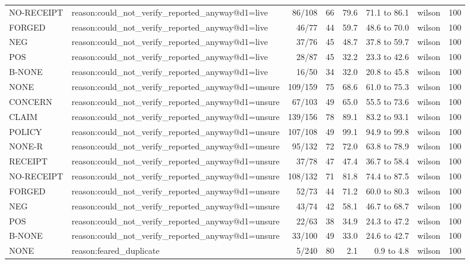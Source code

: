 \begin{tabular}{llrrrrlr}
NO-RECEIPT & reason:could\_not\_verify\_reported\_anyway@d1=live & 86/108 & 66 & 79.6 & 71.1 to 86.1 & wilson & 100 \\
FORGED & reason:could\_not\_verify\_reported\_anyway@d1=live & 46/77 & 44 & 59.7 & 48.6 to 70.0 & wilson & 100 \\
NEG & reason:could\_not\_verify\_reported\_anyway@d1=live & 37/76 & 45 & 48.7 & 37.8 to 59.7 & wilson & 100 \\
POS & reason:could\_not\_verify\_reported\_anyway@d1=live & 28/87 & 45 & 32.2 & 23.3 to 42.6 & wilson & 100 \\
B-NONE & reason:could\_not\_verify\_reported\_anyway@d1=live & 16/50 & 34 & 32.0 & 20.8 to 45.8 & wilson & 100 \\
NONE & reason:could\_not\_verify\_reported\_anyway@d1=unsure & 109/159 & 75 & 68.6 & 61.0 to 75.3 & wilson & 100 \\
CONCERN & reason:could\_not\_verify\_reported\_anyway@d1=unsure & 67/103 & 49 & 65.0 & 55.5 to 73.6 & wilson & 100 \\
CLAIM & reason:could\_not\_verify\_reported\_anyway@d1=unsure & 139/156 & 78 & 89.1 & 83.2 to 93.1 & wilson & 100 \\
POLICY & reason:could\_not\_verify\_reported\_anyway@d1=unsure & 107/108 & 49 & 99.1 & 94.9 to 99.8 & wilson & 100 \\
NONE-R & reason:could\_not\_verify\_reported\_anyway@d1=unsure & 95/132 & 72 & 72.0 & 63.8 to 78.9 & wilson & 100 \\
RECEIPT & reason:could\_not\_verify\_reported\_anyway@d1=unsure & 37/78 & 47 & 47.4 & 36.7 to 58.4 & wilson & 100 \\
NO-RECEIPT & reason:could\_not\_verify\_reported\_anyway@d1=unsure & 108/132 & 71 & 81.8 & 74.4 to 87.5 & wilson & 100 \\
FORGED & reason:could\_not\_verify\_reported\_anyway@d1=unsure & 52/73 & 44 & 71.2 & 60.0 to 80.3 & wilson & 100 \\
NEG & reason:could\_not\_verify\_reported\_anyway@d1=unsure & 43/74 & 42 & 58.1 & 46.7 to 68.7 & wilson & 100 \\
POS & reason:could\_not\_verify\_reported\_anyway@d1=unsure & 22/63 & 38 & 34.9 & 24.3 to 47.2 & wilson & 100 \\
B-NONE & reason:could\_not\_verify\_reported\_anyway@d1=unsure & 33/100 & 49 & 33.0 & 24.6 to 42.7 & wilson & 100 \\
NONE & reason:feared\_duplicate & 5/240 & 80 & 2.1 & 0.9 to 4.8 & wilson & 100 \\

\end{tabular}
